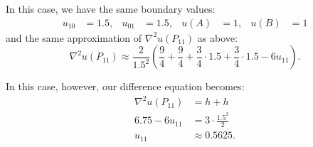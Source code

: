 \begin{derivation}
  In this case, we have the same boundary values:
  \begin{align*}
    u_{10} &= \num{1,5} , & u_{01} &= \num{1,5} , & u(A) &= 1, & u(B) &= 1
  \end{align*}
  and the same approximation of $\nabla^2 u(P_{11}) $ as above:
  \begin{equation*}
    \nabla ^2 u(P_{11}) \approx \frac{2}{\num{1,5}^2} \left( \frac{9}{4} + \frac{9}{4} + \frac{3}{4} \cdot \num{1,5}  + \frac{3}{4}\cdot \num{1,5} - 6u_{11} \right) 
  .\end{equation*}
  
  In this case, however, our difference equation becomes:
  \begin{align*}
    \nabla^2 u(P_{11}) &= h + h \\
    \num{6,75}  - 6u_{11} &= 3 \cdot \frac{\num{1,5}^2}{2}\\
    u_{11} &\approx \num{0,5625} 
  .\end{align*}
\end{derivation}

